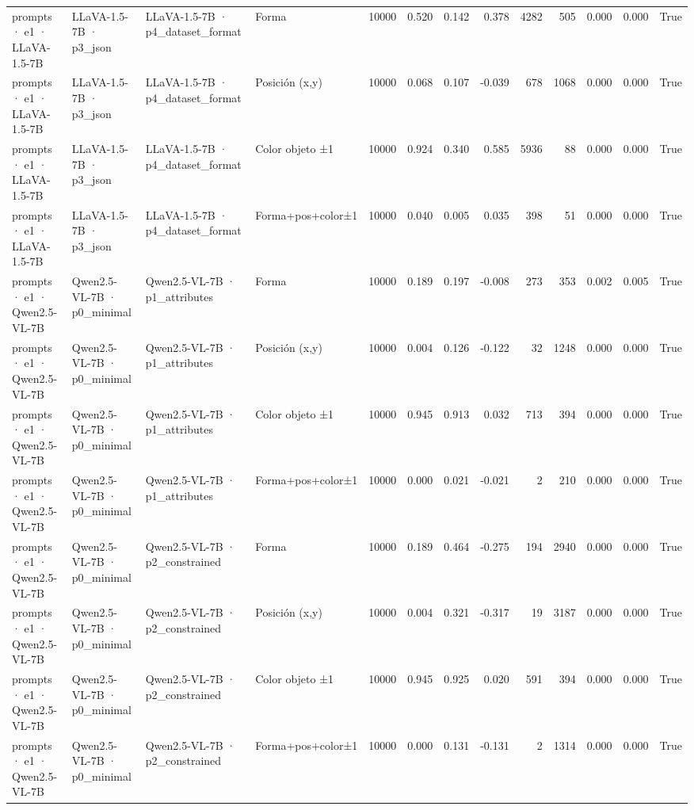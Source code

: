 \begin{tabular}{llllrrrrrrrrr}
prompts · e1 · LLaVA-1.5-7B & LLaVA-1.5-7B · p3\_json & LLaVA-1.5-7B · p4\_dataset\_format & Forma & 10000 & 0.520 & 0.142 & 0.378 & 4282 & 505 & 0.000 & 0.000 & True \\
prompts · e1 · LLaVA-1.5-7B & LLaVA-1.5-7B · p3\_json & LLaVA-1.5-7B · p4\_dataset\_format & Posición (x,y) & 10000 & 0.068 & 0.107 & -0.039 & 678 & 1068 & 0.000 & 0.000 & True \\
prompts · e1 · LLaVA-1.5-7B & LLaVA-1.5-7B · p3\_json & LLaVA-1.5-7B · p4\_dataset\_format & Color objeto ±1 & 10000 & 0.924 & 0.340 & 0.585 & 5936 & 88 & 0.000 & 0.000 & True \\
prompts · e1 · LLaVA-1.5-7B & LLaVA-1.5-7B · p3\_json & LLaVA-1.5-7B · p4\_dataset\_format & Forma+pos+color±1 & 10000 & 0.040 & 0.005 & 0.035 & 398 & 51 & 0.000 & 0.000 & True \\
prompts · e1 · Qwen2.5-VL-7B & Qwen2.5-VL-7B · p0\_minimal & Qwen2.5-VL-7B · p1\_attributes & Forma & 10000 & 0.189 & 0.197 & -0.008 & 273 & 353 & 0.002 & 0.005 & True \\
prompts · e1 · Qwen2.5-VL-7B & Qwen2.5-VL-7B · p0\_minimal & Qwen2.5-VL-7B · p1\_attributes & Posición (x,y) & 10000 & 0.004 & 0.126 & -0.122 & 32 & 1248 & 0.000 & 0.000 & True \\
prompts · e1 · Qwen2.5-VL-7B & Qwen2.5-VL-7B · p0\_minimal & Qwen2.5-VL-7B · p1\_attributes & Color objeto ±1 & 10000 & 0.945 & 0.913 & 0.032 & 713 & 394 & 0.000 & 0.000 & True \\
prompts · e1 · Qwen2.5-VL-7B & Qwen2.5-VL-7B · p0\_minimal & Qwen2.5-VL-7B · p1\_attributes & Forma+pos+color±1 & 10000 & 0.000 & 0.021 & -0.021 & 2 & 210 & 0.000 & 0.000 & True \\
prompts · e1 · Qwen2.5-VL-7B & Qwen2.5-VL-7B · p0\_minimal & Qwen2.5-VL-7B · p2\_constrained & Forma & 10000 & 0.189 & 0.464 & -0.275 & 194 & 2940 & 0.000 & 0.000 & True \\
prompts · e1 · Qwen2.5-VL-7B & Qwen2.5-VL-7B · p0\_minimal & Qwen2.5-VL-7B · p2\_constrained & Posición (x,y) & 10000 & 0.004 & 0.321 & -0.317 & 19 & 3187 & 0.000 & 0.000 & True \\
prompts · e1 · Qwen2.5-VL-7B & Qwen2.5-VL-7B · p0\_minimal & Qwen2.5-VL-7B · p2\_constrained & Color objeto ±1 & 10000 & 0.945 & 0.925 & 0.020 & 591 & 394 & 0.000 & 0.000 & True \\
prompts · e1 · Qwen2.5-VL-7B & Qwen2.5-VL-7B · p0\_minimal & Qwen2.5-VL-7B · p2\_constrained & Forma+pos+color±1 & 10000 & 0.000 & 0.131 & -0.131 & 2 & 1314 & 0.000 & 0.000 & True \\

\end{tabular}
